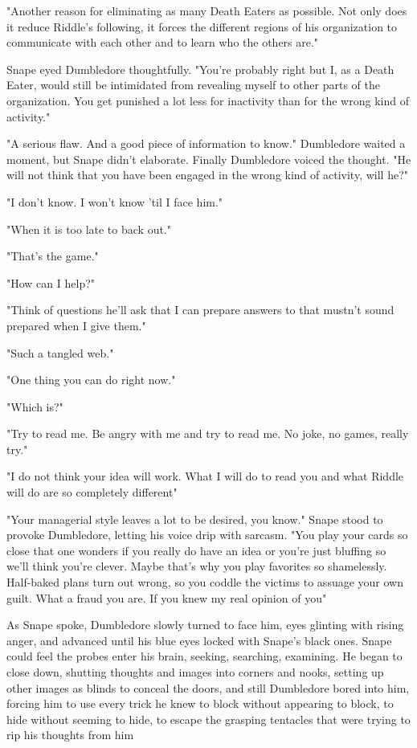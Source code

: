"Another reason for eliminating as many Death Eaters as possible. Not only does it reduce Riddle's following, it forces the different regions of his organization to communicate with each other and to learn who the others are."

Snape eyed Dumbledore thoughtfully. "You're probably right but I, as a Death Eater, would still be intimidated from revealing myself to other parts of the organization. You get punished a lot less for inactivity than for the wrong kind of activity."

"A serious flaw. And a good piece of information to know." Dumbledore waited a moment, but Snape didn't elaborate. Finally Dumbledore voiced the thought. "He will not think that you have been engaged in the wrong kind of activity, will he?"

"I don't know. I won't know 'til I face him."

"When it is too late to back out."

"That's the game."

"How can I help?"

"Think of questions he'll ask that I can prepare answers to that mustn't sound prepared when I give them."

"Such a tangled web."

"One thing you can do right now."

"Which is{\el}?"

"Try to read me. Be angry with me and try to read me. No joke, no games, really try."

"I do not think your idea will work. What I will do to read you and what Riddle will do are so completely different{\el}"

"Your managerial style leaves a lot to be desired, you know." Snape stood to provoke Dumbledore, letting his voice drip with sarcasm. "You play your cards so close that one wonders if you really do have an idea or you're just bluffing so we'll think you're clever. Maybe that's why you play favorites so shamelessly. Half-baked plans turn out wrong, so you coddle the victims to assuage your own guilt. What a fraud you are. If you knew my real opinion of you{\el}"

As Snape spoke, Dumbledore slowly turned to face him, eyes glinting with rising anger, and advanced until his blue eyes locked with Snape's black ones. Snape could feel the probes enter his brain, seeking, searching, examining. He began to close down, shutting thoughts and images into corners and nooks, setting up other images as blinds to conceal the doors, and still Dumbledore bored into him, forcing him to use every trick he knew to block without appearing to block, to hide without seeming to hide, to escape the grasping tentacles that were trying to rip his thoughts from him{\el}

